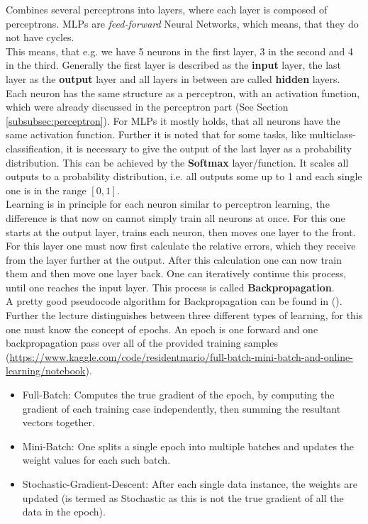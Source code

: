 \documentclass[12pt,a4paper]{article}
\begin{document}
\noindent Combines several perceptrons into layers, where each layer is composed of perceptrons. MLPs are \textit{feed-forward} Neural Networks, which means, that they do not have cycles.\\
This means, that e.g. we have 5 neurons in the first layer, 3 in the second and 4 in the third. Generally the first layer is described as the \textbf{input} layer, the last layer as the \textbf{output} layer and all layers in between are called \textbf{hidden} layers.\\
Each neuron has the same structure as a perceptron, with an activation function, which were already discussed in the perceptron part (See Section \ref{subsubsec:perceptron}). For MLPs it mostly holds, that all neurons have the same activation function. Further it is noted that for some tasks, like multiclass-classification, it is necessary to give the output of the last layer as a probability distribution. This can be achieved by the \textbf{Softmax} layer/function. It scales all outputs to a probability distribution, i.e. all outputs some up to 1 and each single one is in the range \([0,1]\).\\[1em]
Learning is in principle for each neuron similar to perceptron learning, the difference is that now on cannot simply train all neurons at once. For this one starts at the output layer, trains each neuron, then moves one layer to the front. For this layer one must now first calculate the relative errors, which they receive from the layer further at the output. After this calculation one can now train them and then move one layer back. One can iteratively continue this process, until one reaches the input layer. This process is called \textbf{Backpropagation}.\\
A pretty good pseudocode algorithm for Backpropagation can be found in (\cite{aima}).\\[1em]
Further the lecture distinguishes between three different types of learning, for this one must know the concept of epochs. An epoch is one forward and one backpropagation pass over all of the provided training samples (\url{https://www.kaggle.com/code/residentmario/full-batch-mini-batch-and-online-learning/notebook}).\\

\begin{itemize}
    \item Full-Batch: Computes the true gradient of the epoch, by computing the gradient of each training case independently, then summing the resultant vectors together.
    \item Mini-Batch: One splits a single epoch into multiple batches and updates the weight values for each such batch.
    \item Stochastic-Gradient-Descent: After each single data instance, the weights are updated (is termed as Stochastic as this is not the true gradient of all the data in the epoch).
\end{itemize}
\end{document}
